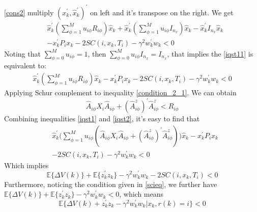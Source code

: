 \documentclass[conference]{IEEEtran}
\begin{document}
\eqref{cons2} multiply $(x^{'}_k,\hat{x}^{'}_{k})^{'}$ on left and it's transpose on the right. We get\\
\begin{equation} \label{iqst11}
	\begin{split}
		&\hat{x}^{'}_{k}(\sum_{\phi=1}^{M}u_{i\phi}R_{i\phi})\hat{x}_k+ \hat{x}^{'}_{k}(\sum_{\phi=1}^{M}u_{i\phi}I_{n_{x}})\hat{x}_{k}-\hat{x}^{'}_{k}I_{n_{x}}\hat{x}_{k}\\
		&-x^{'}_{k}P_{i}x_{k}-2SC(i,x_k,T_i)-\gamma^{2}w^{'}_{k}w_{k}<0
	\end{split}
\end{equation}
Noting that $\sum_{\phi=0}^{M}u_{i\phi}=1$, then $\sum_{\phi=0}^{M}u_{i\phi}I_{n_x}=I_{n_x}$, that implies the \eqref{iqst11} is equivalent to:
\begin{equation} \label{iqst1}
\begin{split}
\hat{x}^{'}_{k}(\sum_{\phi=1}^{M}u_{i\phi}R_{i\phi})\hat{x}_k-x^{'}_{k}P_{i}x_{k}-2SC(i,x_k,T_i)-\gamma^{2}w^{'}_{k}w_{k}<0
\end{split}
\end{equation}
Applying Schur complement to inequality \eqref{condition_2_1}. We can obtain \\
\begin{equation} \label{iqst2}
\hat{A}_{i\phi}X_{i}\hat{A}_{i\phi}+(\hat{A}^{z}_{i\phi})^{'}\hat{A}^{z}_{i\phi}<R_{i\phi}
\end{equation}
Combining inequalities \eqref{iqst1} and \eqref{iqst2}, it's easy to find that \\
\begin{equation} \label{leq222}
	\begin{split}
		&\hat{x}^{'}_{k}\Big(\sum_{\phi=1}^{M}u_{i\phi}(\hat{A}_{i\phi}X_{i}\hat{A}_{i\phi}+(\hat{A}^{z}_{i\phi})^{'}\hat{A}^{z}_{i\phi})\Big)\hat{x}_k-x^{'}_{k}P_{i}x_{k}\\
		&-2SC(i,x_k,T_i)-\gamma^{2}w^{'}_{k}w_{k}<0
	\end{split}
\end{equation}
Which implies 
\begin{equation} \label{eq31}
	\mathbb{E}\{\varDelta V(k)\}+\mathbb{E}\{z^{'}_{k}z_{k}\}-\gamma^{2}w^{'}_{k}w_{k}-2SC(i,x_k,T_i)<0
\end{equation}
Furthermore, noticing the condition given in \eqref{scieq}, we further have $\mathbb{E}\{\varDelta V(k)\}+\mathbb{E}\{z^{'}_{k}z_{k}\}-\gamma^{2}w^{'}_{k}w_{k}<0$, which means
\begin{equation}
	\mathbb{E}\{\varDelta V(k)+z^{'}_{k}z_{k}-\gamma^{2}w^{'}_{k}w_{k}|x_{k},r(k)=i \}<0
\end{equation}
\end{document}
